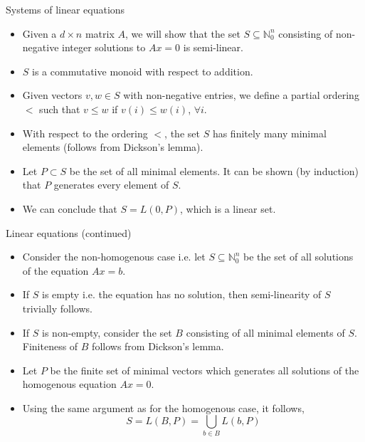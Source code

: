 \documentclass[10pt]{beamer}
\begin{document}
\begin{frame}{Systems of linear equations}
    \begin{itemize}
        \item Given a $d\times n$ matrix $A$, we will show that the set $S\subseteq \mathbb{N}_0^n$ consisting of non-negative 
        integer solutions to $Ax=0$ is semi-linear.
        \item $S$ is a commutative monoid with respect to addition.   
        \item Given vectors $v,w\in S$ with non-negative entries, we define a partial ordering $<$ such that $v\leq w$ if $v(i)\leq w(i)$, 
         $\forall i$. 
        \item With respect to the ordering $<$, the set $S$ has finitely many minimal elements (follows from Dickson's lemma). 
        \item Let $P\subset S$ be the set of all minimal elements. It can be shown (by induction) that $P$ generates every element of
        $S$.  
        \item We can conclude that $S=L(0,P)$, which is a linear set.
    \end{itemize}
\end{frame}
\begin{frame}{Linear equations (continued)}
    \begin{itemize}
        \item Consider the non-homogenous case i.e. let $S\subseteq \mathbb{N}_0^n$ be the set of all solutions of the 
        equation $Ax=b$. 
        \item If $S$ is empty i.e. the equation has no solution, then semi-linearity of $S$ trivially follows.
        \item If $S$ is non-empty, consider the set $B$ consisting of all minimal elements of $S$.
        Finiteness of $B$ follows from Dickson's lemma.
        \item Let $P$ be the finite set of minimal vectors which generates all solutions of the homogenous equation $Ax=0$.
        \item Using the same argument as for the homogenous case, it follows,
        \[ S=L(B,P)=\bigcup_{b\in B}L(b,P) \]  
    \end{itemize}
\end{frame}
\end{document}
